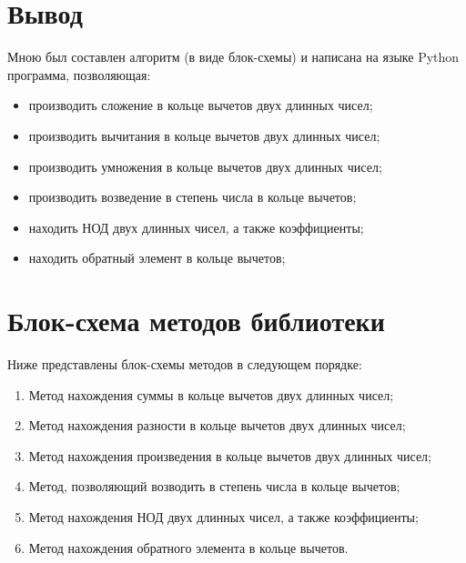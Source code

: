\section{Вывод}
Мною был составлен алгоритм (в виде блок-схемы) и написана на языке Python программа, позволяющая:
\begin{itemize}
    \item производить сложение в кольце вычетов двух длинных чисел;
    \item производить вычитания в кольце вычетов двух длинных чисел;
    \item производить умножения в кольце вычетов двух длинных чисел;
    \item производить возведение в степень числа в кольце вычетов;
    \item находить НОД двух длинных чисел, а также коэффициенты;
    \item находить обратный элемент в кольце вычетов;
\end{itemize}

\clearpage
\section{Блок-схема методов библиотеки}
Ниже представлены блок-схемы методов в следующем порядке:
\begin{enumerate}
    \item Метод нахождения суммы в кольце вычетов двух длинных чисел;
    \item Метод нахождения разности в кольце вычетов двух длинных чисел;
    \item Метод нахождения произведения в кольце вычетов двух длинных чисел;
    \item Метод, позволяющий возводить в степень числа в кольце вычетов;
    \item Метод нахождения НОД двух длинных чисел, а также коэффициенты;
    \item Метод нахождения обратного элемента в кольце вычетов.
\end{enumerate}

